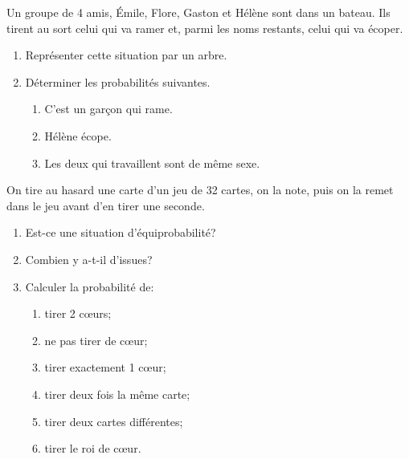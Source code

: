 \begin{exercice}
Un groupe de 4 amis, \'Emile, Flore, Gaston et Hélène sont dans un bateau. Ils tirent au sort celui qui va ramer et, parmi les noms restants, celui qui va écoper.
\begin{enumerate}
\item Représenter cette situation par un arbre.
\item Déterminer les probabilités suivantes.
\begin{enumerate}
\item C'est un garçon qui rame.
\item Hélène écope.
\item Les deux qui travaillent sont de même sexe.
\end{enumerate}
\end{enumerate}  
\end{exercice}



\begin{exercice}
On tire au hasard une carte d'un jeu de 32 cartes, on la note, puis on la remet dans le jeu avant d'en tirer une seconde.
	\begin{enumerate}
		\item Est-ce une situation d'équiprobabilité?
		\item Combien y a-t-il d'issues?
		\item Calculer la probabilité de:
		\begin{enumerate}
			\item tirer 2 c\oe urs;
			\item  ne pas tirer de c\oe ur;
			\item tirer exactement 1 c\oe ur;
			\item tirer deux fois la même carte;
			\item tirer deux cartes différentes;
			\item tirer le roi de c\oe ur.
		\end{enumerate}	
	\end{enumerate}
\end{exercice}

